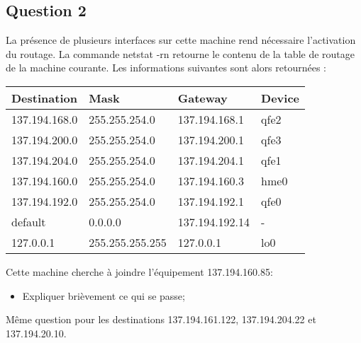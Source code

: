 \documentclass{article}
\begin{document}
\subsection*{Question 2}
La présence de plusieurs interfaces sur cette machine rend nécessaire l'activation du routage. La commande netstat -rn retourne le contenu de la table de routage de la machine courante. Les informations suivantes sont alors retournées :
\begin{table}[H]
    \centering\begin{tabular}{lll |l}
        Destination & Mask & Gateway & Device\\
        \hline
        137.194.168.0 & 255.255.254.0   & 137.194.168.1 & qfe2\\
        137.194.200.0 & 255.255.254.0   & 137.194.200.1 & qfe3\\
        137.194.204.0 & 255.255.254.0   & 137.194.204.1 & qfe1\\
        137.194.160.0 & 255.255.254.0   & 137.194.160.3 & hme0\\
        137.194.192.0 & 255.255.254.0   & 137.194.192.1 & qfe0\\
        default       & 0.0.0.0         & 137.194.192.14 & -\\
        127.0.0.1     & 255.255.255.255 & 127.0.0.1 & lo0\\
        \hline
    \end{tabular}
\end{table}
\begin{exercise}
    Cette machine cherche à joindre l'équipement 137.194.160.85:
    \begin{itemize}
        \item Expliquer brièvement ce qui se passe;
    \end{itemize}
    Même question pour les destinations 137.194.161.122, 137.194.204.22 et 137.194.20.10.
\end{exercise}
\end{document}
